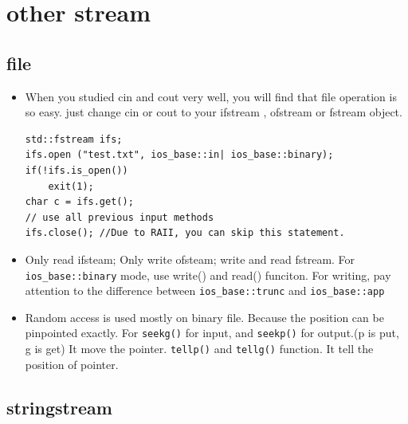 \documentclass[a4paper,11pt,twoside]{book}
\begin{document}
\section{other stream}

\subsection{file}
\begin{itemize}
	\item When you studied cin and cout very well, you will find that file operation is so easy. just change cin or cout to your ifstream , ofstream or fstream object.
	
\begin{lstlisting}[numbers=none]
std::fstream ifs;
ifs.open ("test.txt", ios_base::in| ios_base::binary);
if(!ifs.is_open())
	exit(1);
char c = ifs.get();
// use all previous input methods
ifs.close(); //Due to RAII, you can skip this statement.
\end{lstlisting}
	\item Only read ifsteam;  Only write ofsteam; write and read fstream.  For \texttt{ios\_base::binary} mode, use write() and read() funciton. For writing, pay attention to the difference between \texttt{ios\_base::trunc} and \texttt{ios\_base::app}
	
	\item Random access is used mostly on binary file. Because the position can be pinpointed exactly. For \texttt{seekg()} for input, and \texttt{seekp()} for output.(p is put, g is get) It move the pointer. \texttt{tellp()} and \texttt{tellg()} function.  It tell the position of pointer.
	
\end{itemize}

\subsection{stringstream}
\end{document}
